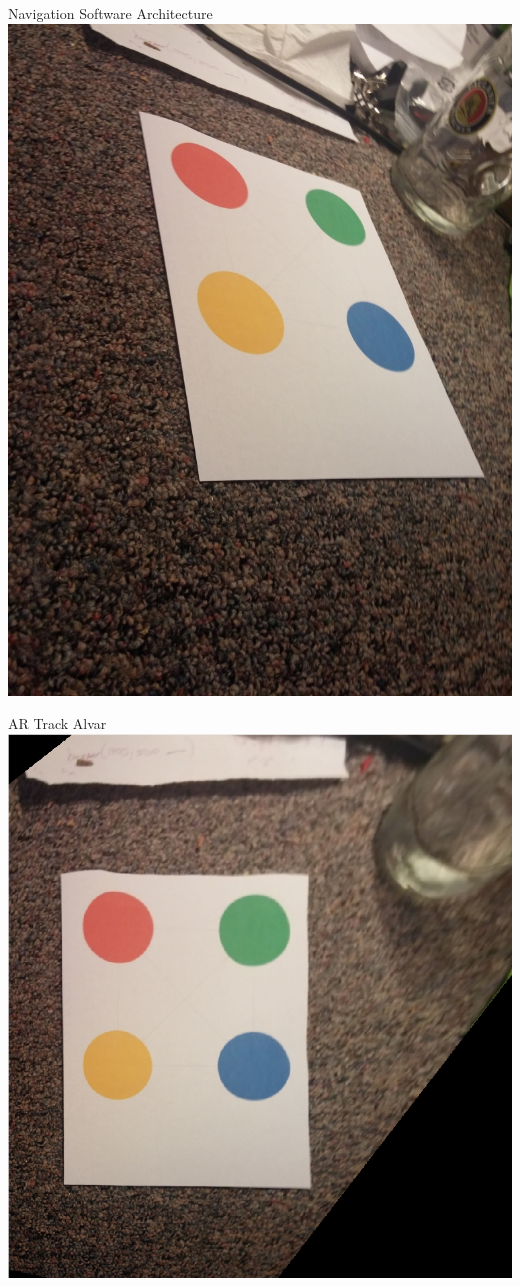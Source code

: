 \documentclass[11pt]{beamer}
\begin{document}
\begin{frame}{Navigation Software Architecture}
	\centering
	\includegraphics[width=.66\textwidth]{images/skewball}
\end{frame}

\begin{frame}{AR Track Alvar}
	\centering
	\includegraphics[width=.66\textwidth]{images/img_reconstruction02}
\end{frame}


\end{document}
